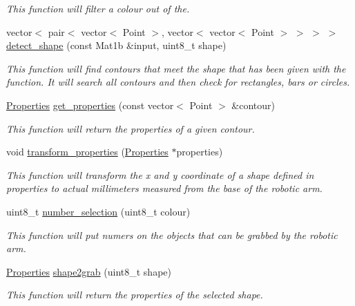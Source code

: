 \begin{DoxyCompactItemize}
\begin{DoxyCompactList}\small\item\em This function will filter a colour out of the. \end{DoxyCompactList}\item 
vector$<$ pair$<$ vector$<$ Point $>$, vector$<$ vector$<$ Point $>$ $>$ $>$ $>$ \hyperlink{class_vision_ac61f35fd2d78031d96986b8db8daf257}{detect\+\_\+shape} (const Mat1b \&input, uint8\+\_\+t shape)
\begin{DoxyCompactList}\small\item\em This function will find contours that meet the shape that has been given with the function. It will search all contours and then check for rectangles, bars or circles. \end{DoxyCompactList}\item 
\hyperlink{struct_properties}{Properties} \hyperlink{class_vision_a41e694aef79da35cad92f9e57ecdea4e}{get\+\_\+properties} (const vector$<$ Point $>$ \&contour)
\begin{DoxyCompactList}\small\item\em This function will return the properties of a given contour. \end{DoxyCompactList}\item 
void \hyperlink{class_vision_acd6cf5d0e7bba1adfb6f123d76489a6d}{transform\+\_\+properties} (\hyperlink{struct_properties}{Properties} $\ast$properties)
\begin{DoxyCompactList}\small\item\em This function will transform the x and y coordinate of a shape defined in properties to actual millimeters measured from the base of the robotic arm. \end{DoxyCompactList}\item 
uint8\+\_\+t \hyperlink{class_vision_a7c9c698f6da2af1773bd0b65ba4bfd34}{number\+\_\+selection} (uint8\+\_\+t colour)
\begin{DoxyCompactList}\small\item\em This function will put numers on the objects that can be grabbed by the robotic arm. \end{DoxyCompactList}\item 
\hyperlink{struct_properties}{Properties} \hyperlink{class_vision_a136b9affd9c8fdae0583b9a56d3817e4}{shape2grab} (uint8\+\_\+t shape)
\begin{DoxyCompactList}\small\item\em This function will return the properties of the selected shape. \end{DoxyCompactList}\end{DoxyCompactItemize}
